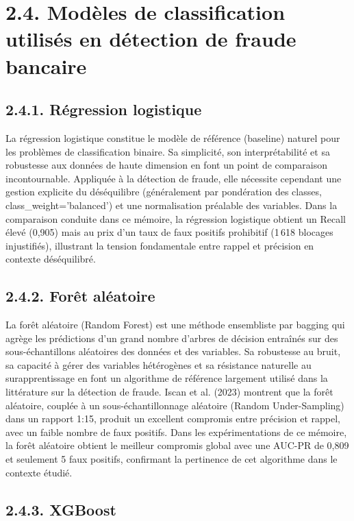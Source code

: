\section{2.4. Modèles de classification utilisés en détection de fraude bancaire}

\subsection{2.4.1. Régression logistique}

La régression logistique constitue le modèle de référence (baseline) naturel pour les problèmes de classification binaire. Sa simplicité, son interprétabilité et sa robustesse aux données de haute dimension en font un point de comparaison incontournable. Appliquée à la détection de fraude, elle nécessite cependant une gestion explicite du déséquilibre (généralement par pondération des classes, class\_weight='balanced') et une normalisation préalable des variables. Dans la comparaison conduite dans ce mémoire, la régression logistique obtient un Recall élevé (0,905) mais au prix d'un taux de faux positifs prohibitif (1 618 blocages injustifiés), illustrant la tension fondamentale entre rappel et précision en contexte déséquilibré.

\subsection{2.4.2. Forêt aléatoire}

La forêt aléatoire (Random Forest) est une méthode ensembliste par bagging qui agrège les prédictions d'un grand nombre d'arbres de décision entraînés sur des sous-échantillons aléatoires des données et des variables. Sa robustesse au bruit, sa capacité à gérer des variables hétérogènes et sa résistance naturelle au surapprentissage en font un algorithme de référence largement utilisé dans la littérature sur la détection de fraude. Iscan et al. (2023) montrent que la forêt aléatoire, couplée à un sous-échantillonnage aléatoire (Random Under-Sampling) dans un rapport 1:15, produit un excellent compromis entre précision et rappel, avec un faible nombre de faux positifs. Dans les expérimentations de ce mémoire, la forêt aléatoire obtient le meilleur compromis global avec une AUC-PR de 0,809 et seulement 5 faux positifs, confirmant la pertinence de cet algorithme dans le contexte étudié.

\subsection{2.4.3. XGBoost}


